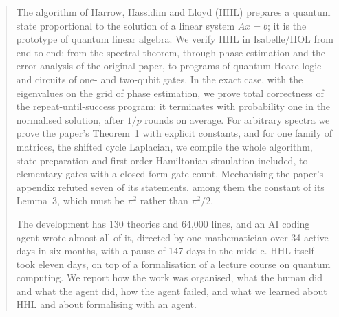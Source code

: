 \begin{abstract}
The algorithm of Harrow, Hassidim and Lloyd (HHL) prepares a quantum state proportional to the
solution of a linear system $Ax=b$; it is the prototype of quantum linear algebra. We verify HHL in
Isabelle/HOL from end to end: from the spectral theorem, through phase estimation and the error
analysis of the original paper, to programs of quantum Hoare logic and circuits of one- and two-qubit
gates. In the exact case, with the eigenvalues on the grid of phase estimation, we prove total
correctness of the repeat-until-success program: it terminates with probability one in the normalised solution, after $1/p$ rounds on average. For
arbitrary spectra we prove the paper's Theorem~1 with explicit constants, and for one family of matrices,
the shifted cycle Laplacian, we compile the whole algorithm, state preparation and first-order
Hamiltonian simulation included, to elementary gates with a closed-form gate count. Mechanising the paper's appendix refuted seven of its
statements, among them the constant of its Lemma~3, which must be $\pi^2$ rather than $\pi^2/2$.

The development has 130 theories and 64{,}000 lines, and an AI coding agent wrote almost all of it,
directed by one mathematician over 34 active days in six months, with a pause of 147 days in the
middle. HHL itself took eleven days, on top of a formalisation of a lecture course on quantum
computing. We report how the work was organised, what the human did and what the agent did, how the
agent failed, and what we learned about HHL and about formalising with an agent.
\end{abstract}
